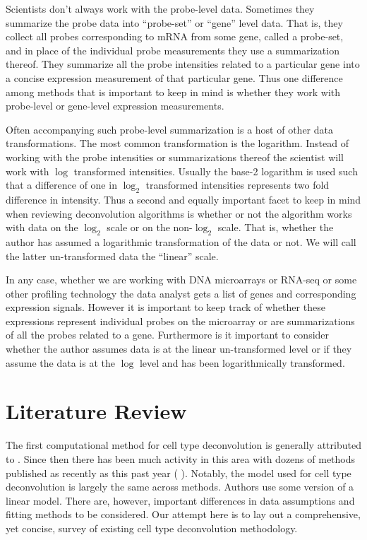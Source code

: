 \documentclass[reqno,12pt,oneside]{report}\usepackage[]{graphicx}\usepackage[]{color}
\renewcommand{\citet}[1]{(\citeauthor{#1} \citeyear{#1})}
\theoremstyle{plain}
\theoremstyle{definition}
\theoremstyle{remark}
\numberwithin{theorem}{chapter}     %
\begin{document}
Scientists don't always work with the probe-level data. Sometimes they summarize the probe data into ``probe-set'' or ``gene'' level data. That is, they collect all probes corresponding to mRNA from some gene, called a probe-set, and in place of the individual probe measurements they use a summarization thereof. They summarize all the probe intensities related to a particular gene into a concise expression measurement of that particular gene. Thus one difference among methods that is important to keep in mind is whether they work with probe-level or gene-level expression measurements. 

Often accompanying such probe-level summarization is a host of other data transformations. The most common transformation is the logarithm. Instead of working with the probe intensities or summarizations thereof the scientist will work with $\log$ transformed intensities. Usually the base-2 logarithm is used such that a difference of one in $\log_2$ transformed intensities represents two fold difference in intensity. Thus a second and equally important facet to keep in mind when reviewing deconvolution algorithms is whether or not the algorithm works with data on the $\log_2$ scale or on the non-$\log_2$ scale. That is, whether the author has assumed a logarithmic transformation of the data or not. We will call the latter un-transformed data the ``linear'' scale.

In any case, whether we are working with DNA microarrays or RNA-seq or some other profiling technology the data analyst gets a list of genes and corresponding expression signals. However it is important to keep track of whether these expressions represent individual probes on the microarray or are summarizations of all the probes related to a gene. Furthermore is it important to consider whether the author assumes data is at the linear un-transformed level or if they assume the data is at the $\log$ level and has been logarithmically transformed. 

 \chapter{Literature Review}
 \label{chap:Lit}

The first computational method for cell type deconvolution is generally attributed to \cite{Venet2001}. Since then there has been much activity in this area with dozens of methods published as recently as this past year \citet{Newman2015}. Notably, the model used for cell type deconvolution is largely the same across methods. Authors use some version of a linear model. There are, however, important differences in data assumptions and fitting methods to be considered. Our attempt here is to lay out a comprehensive, yet concise, survey of existing cell type deconvolution methodology.
\end{document}
